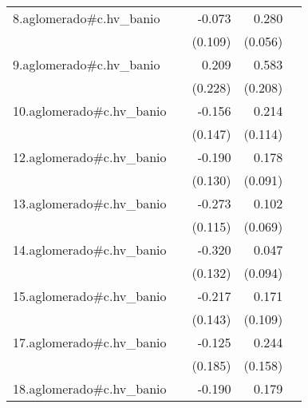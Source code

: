 {\begin{longtable}{l*{4}{D{.}{.}{-1}}}
\addlinespace
8.aglomerado#c.hv\_banio&                     &      -0.073         &       0.280\sym{***}&                     \\
            &                     &     (0.109)         &     (0.056)         &                     \\
\addlinespace
9.aglomerado#c.hv\_banio&                     &       0.209         &       0.583\sym{**} &                     \\
            &                     &     (0.228)         &     (0.208)         &                     \\
\addlinespace
10.aglomerado#c.hv\_banio&                     &      -0.156         &       0.214         &                     \\
            &                     &     (0.147)         &     (0.114)         &                     \\
\addlinespace
12.aglomerado#c.hv\_banio&                     &      -0.190         &       0.178\sym{*}  &                     \\
            &                     &     (0.130)         &     (0.091)         &                     \\
\addlinespace
13.aglomerado#c.hv\_banio&                     &      -0.273\sym{*}  &       0.102         &                     \\
            &                     &     (0.115)         &     (0.069)         &                     \\
\addlinespace
14.aglomerado#c.hv\_banio&                     &      -0.320\sym{*}  &       0.047         &                     \\
            &                     &     (0.132)         &     (0.094)         &                     \\
\addlinespace
15.aglomerado#c.hv\_banio&                     &      -0.217         &       0.171         &                     \\
            &                     &     (0.143)         &     (0.109)         &                     \\
\addlinespace
17.aglomerado#c.hv\_banio&                     &      -0.125         &       0.244         &                     \\
            &                     &     (0.185)         &     (0.158)         &                     \\
\addlinespace
18.aglomerado#c.hv\_banio&                     &      -0.190         &       0.179\sym{***}&                     \\

\end{longtable}}
